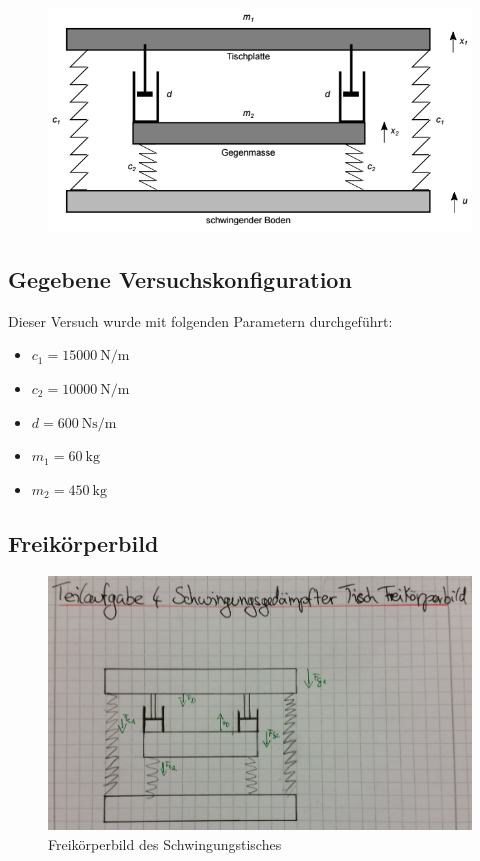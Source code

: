 \documentclass[]{scrartcl}
\begin{document}
\begin{figure}[H]
\centering
\includegraphics[width=0.5\linewidth]{./4_Versuchsaufbau}
\caption{}
\label{fig:4_Versuchsaufbau}
\end{figure}

\subsection{Gegebene Versuchskonfiguration}
Dieser Versuch wurde mit folgenden Parametern durchgeführt:
\begin{itemize}
\item $c_{1} = \SI[per-mode=fraction]{15 000}{\newton\per\metre}$
\item $c_{2} = \SI[per-mode=fraction]{10 000}{\newton\per\metre}$
\item $d = \SI[per-mode=fraction]{600}{\newton\second\per\metre}$
\item $m_{1} = \SI{60}{\kg}$
\item $m_{2} = \SI{450}{\kg}$
\end{itemize}

\subsection{Freikörperbild}

\begin{figure}[H]
\centering
\includegraphics[width=1\linewidth]{./4_Freikoerperbild}
\caption{Freikörperbild des Schwingungstisches}
\label{fig:4_Freikoerperbild}
\end{figure}
\end{document}
